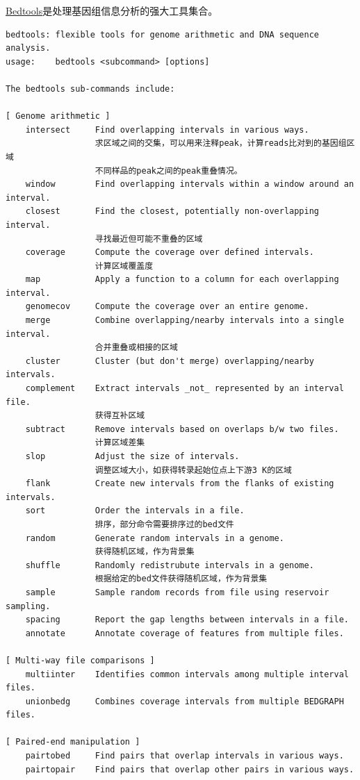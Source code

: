 \documentclass[]{article}
\numberwithin{figure}{section}
\numberwithin{table}{section}
\begin{document}
\href{http://bedtools.readthedocs.io/en/latest/}{Bedtools}是处理基因组信息分析的强大工具集合。

\begin{verbatim}
bedtools: flexible tools for genome arithmetic and DNA sequence analysis.
usage:    bedtools <subcommand> [options]

The bedtools sub-commands include:

[ Genome arithmetic ]
    intersect     Find overlapping intervals in various ways.
				  求区域之间的交集，可以用来注释peak，计算reads比对到的基因组区域
				  不同样品的peak之间的peak重叠情况。
    window        Find overlapping intervals within a window around an interval.
    closest       Find the closest, potentially non-overlapping interval.
				  寻找最近但可能不重叠的区域
    coverage      Compute the coverage over defined intervals.
	              计算区域覆盖度
    map           Apply a function to a column for each overlapping interval.
    genomecov     Compute the coverage over an entire genome.
    merge         Combine overlapping/nearby intervals into a single interval.
				  合并重叠或相接的区域
    cluster       Cluster (but don't merge) overlapping/nearby intervals.
    complement    Extract intervals _not_ represented by an interval file.
	              获得互补区域
    subtract      Remove intervals based on overlaps b/w two files.
	              计算区域差集
    slop          Adjust the size of intervals.
	              调整区域大小，如获得转录起始位点上下游3 K的区域
    flank         Create new intervals from the flanks of existing intervals.
    sort          Order the intervals in a file.
	              排序，部分命令需要排序过的bed文件
    random        Generate random intervals in a genome.
	              获得随机区域，作为背景集
    shuffle       Randomly redistrubute intervals in a genome.
	              根据给定的bed文件获得随机区域，作为背景集
    sample        Sample random records from file using reservoir sampling.
    spacing       Report the gap lengths between intervals in a file.
    annotate      Annotate coverage of features from multiple files.

[ Multi-way file comparisons ]
    multiinter    Identifies common intervals among multiple interval files.
    unionbedg     Combines coverage intervals from multiple BEDGRAPH files.

[ Paired-end manipulation ]
    pairtobed     Find pairs that overlap intervals in various ways.
    pairtopair    Find pairs that overlap other pairs in various ways.


\end{verbatim}
\end{document}
